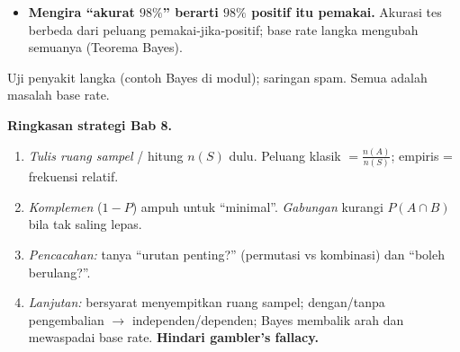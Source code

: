 \begin{jebakan}
\begin{itemize}[leftmargin=*,topsep=2pt]
  \item \textbf{Mengira ``akurat $98\%$'' berarti $98\%$ positif itu pemakai.}
  Akurasi tes berbeda dari peluang pemakai-jika-positif; base rate langka
  mengubah semuanya (Teorema Bayes).
\end{itemize}
\end{jebakan}

\begin{variasi}
Uji penyakit langka (contoh Bayes di modul); saringan spam. Semua adalah
masalah base rate.
\end{variasi}

\begin{tips}
\textbf{Ringkasan strategi Bab 8.}
\begin{enumerate}[leftmargin=*,topsep=2pt]
  \item \emph{Tulis ruang sampel} / hitung $n(S)$ dulu. Peluang klasik
  $=\frac{n(A)}{n(S)}$; empiris = frekuensi relatif.
  \item \emph{Komplemen} ($1-P$) ampuh untuk ``minimal''. \emph{Gabungan}
  kurangi $P(A\cap B)$ bila tak saling lepas.
  \item \emph{Pencacahan:} tanya ``urutan penting?'' (permutasi vs kombinasi)
  dan ``boleh berulang?''.
  \item \emph{Lanjutan:} bersyarat menyempitkan ruang sampel; dengan/tanpa
  pengembalian $\to$ independen/dependen; Bayes membalik arah dan mewaspadai
  base rate. \textbf{Hindari gambler's fallacy.}
\end{enumerate}
\end{tips}


